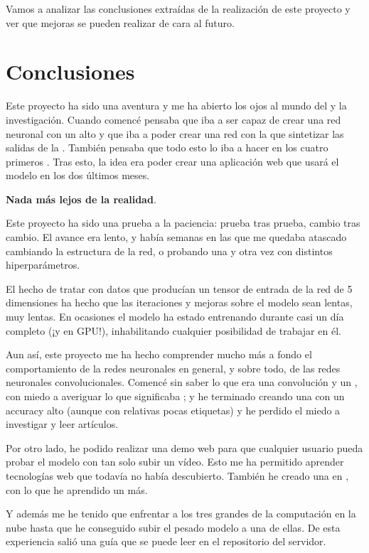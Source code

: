 
Vamos a analizar las conclusiones extraídas de la realización de este proyecto y ver que mejoras se pueden realizar de cara al futuro.

\section{Conclusiones}

Este proyecto ha sido una aventura y me ha abierto los ojos al mundo del  y la investigación. Cuando comencé pensaba que iba a ser capaz de crear una red neuronal con un  alto y que iba a poder crear una red  con la que sintetizar las salidas de la . También pensaba que todo esto lo iba a hacer en los cuatro primeros . Tras esto, la idea era poder crear una aplicación web que usará el modelo en los dos últimos meses.

\textbf{Nada más lejos de la realidad}.

Este proyecto ha sido una prueba a la paciencia: prueba tras prueba, cambio tras cambio. El avance era lento, y había semanas en las que me quedaba atascado cambiando la estructura de la red, o probando una y otra vez con distintos hiperparámetros.

El hecho de tratar con datos que producían un tensor de entrada de la red de 5 dimensiones ha hecho que las iteraciones y mejoras sobre el modelo sean lentas, muy lentas. En ocasiones el modelo ha estado entrenando durante casi un día completo (¡y en GPU!), inhabilitando cualquier posibilidad de trabajar en él.

Aun así, este proyecto me ha hecho comprender mucho más a fondo el comportamiento de la redes neuronales en general, y sobre todo, de las redes neuronales convolucionales. Comencé sin saber lo que era una convolución y un , con miedo a averiguar lo que significaba ; y he terminado creando una  con un accuracy alto (aunque con relativas pocas etiquetas) y he perdido el miedo a investigar y leer artículos.

Por otro lado, he podido realizar una demo web para que cualquier usuario pueda probar el modelo con tan solo subir un vídeo. Esto me ha permitido aprender tecnologías web que todavía no había descubierto. También he creado una  en , con lo que he aprendido un  más.

Y además me he tenido que enfrentar a los tres grandes de la computación en la nube hasta que he conseguido subir el pesado modelo a una de ellas. De esta experiencia salió una guía que se puede leer en el repositorio del servidor.

